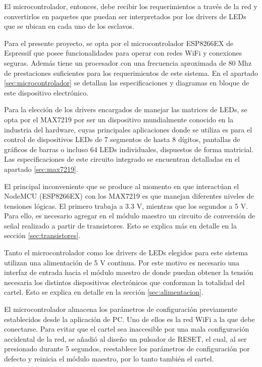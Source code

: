 El microcontrolador, entonces, debe recibir los requerimientos a través de la red y convertirlos en paquetes que puedan ser interpretados por los drivers de LEDs que se ubican en cada uno de los esclavos.

Para el presente proyecto, se opta por el microcontrolador ESP8266EX de Espressif que posee funcionalidades para operar con redes WiFi y conexiones seguras. Además tiene un procesador con una frecuencia aproximada de 80 Mhz de prestaciones suficientes para los requerimientos de este sistema. En el apartado \ref{sec:microcontrolador} se detallan las especificaciones y diagramas en bloque de este dispositivo electrónico.

Para la elección de los drivers encargados de manejar las matrices de LEDs, se opta por el MAX7219 por ser un dispositivo mundialmente conocido en la industria del hardware, cuyas principales aplicaciones donde se utiliza es para el control de dispositivos LEDs de 7 segmentos de hasta 8 dígitos, pantallas de gráficos de barras o incluso 64 LEDs individuales, dispuestos de forma matricial.
Las especificaciones de este circuito integrado se encuentran detalladas en el apartado \ref{sec:max7219}.

El principal inconveniente que se produce al momento en que interactúan el NodeMCU (ESP8266EX) con los MAX7219 es que manejan diferentes niveles de tensiones lógicas. El primero trabaja a 3.3 V, mientras que los segundos a 5 V. Para ello, es necesario agregar en el módulo maestro un circuito de conversión de señal realizado a partir de transistores. Esto se explica más en detalle en la sección \ref{sec:transistores}.

Tanto el microcontrolador como los drivers de LEDs elegidos para este sistema utilizan una alimentación de 5 V continua. Por este motivo es necesario una interfaz de entrada hacia el módulo maestro de donde puedan obtener la tensión necesaria los distintos dispositivos electrónicos que conforman la totalidad del cartel. Esto se explica en detalle en la sección \ref{sec:alimentacion}.

El microcontrolador almacena los parámetros de configuración previamente establecidos desde la aplicación de PC. Uno de ellos es la red WiFi a la que debe conectarse. Para evitar que el cartel sea inaccesible por una mala configuración accidental de la red, se añadió al diseño un pulsador de RESET, el cual, al ser presionado durante 5 segundos, reestablece los parámetros de configuración por defecto y reinicia el módulo maestro, por lo tanto también el cartel.

